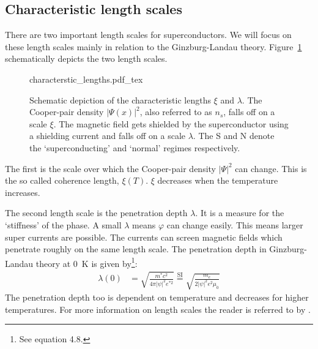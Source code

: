\subsection{Characteristic length scales}
\label{sec:characteristic-length-scales}
There are two important length scales for superconductors. We will focus on these length scales mainly in relation to the Ginzburg-Landau theory.  Figure~\ref{fig:characteristic-lengths} schematically depicts the two length scales.

\begin{figure}[ht!]
	\centering
	\def\svgwidth{\textwidth}
	{characterstic_lengths.pdf_tex}
	\caption{Schematic depiction of the characteristic lengths $\xi$ and $\lambda$. The Cooper-pair density $|\Psi(x)|^2$, also referred to as $n_s$, falls off on a scale $\xi$. The magnetic field gets shielded by the superconductor using a shielding current and falls off on a scale $\lambda$. The S and N denote the `superconducting' and `normal' regimes respectively.}
	\label{fig:characteristic-lengths}
\end{figure}

The first is the scale over which the Cooper-pair density $|\Psi|^2$ can change. This is the so called coherence length, $\xi(T)$. $\xi$ decreases when the temperature increases.\cite{tinkhamIntroductionSuperconductivity}

The second length scale is the penetration depth $\lambda$. It is a measure for the `stiffness' of the phase. A small $\lambda$ means $\varphi$ can change easily. This means larger super currents are possible. The currents can screen magnetic fields which penetrate roughly on the same length scale. The penetration depth in Ginzburg-Landau theory at \qty{0}{\kelvin} is given by\footnote{See  equation 4.8.}:
\begin{align}
	\lambda(0) &= \sqrt{\frac{m^*c^2}{4\pi|\psi|^2e^{*2}}} \stackrel{\text{SI}}{=} \sqrt{\frac{m_e}{2|\psi|^2e^2\mu_0}}
	\label{eqn:london-penetration-depth}
\end{align}
The penetration depth too is dependent on temperature and decreases for higher temperatures. For more information on length scales the reader is referred to  by \citeauthor{tinkhamIntroductionSuperconductivity}.

